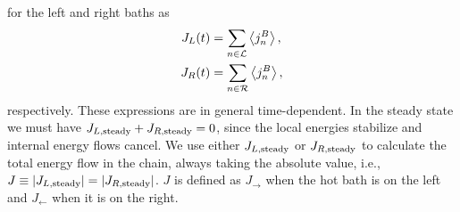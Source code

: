 for the left and right baths as
%
\begin{equation}
    \begin{split}
        J_L (t)&= \sum_{n\in {\cal L}} \expval{j^B_n},\\
        J_R (t)&= \sum_{n\in {\cal R}} \expval{j^B_n},
    \end{split}
    \label{eq:chapter5_BathHeatFlows}
\end{equation}
%
respectively. These expressions are in general time-dependent.
In the steady state we must have $J_{L,{\rm steady}} + J_{R,{\rm steady}} = 0$, since the local energies stabilize and internal energy
flows cancel. We use either $J_{L,{\rm steady}}$ or $J_{R,{\rm steady}}$ to calculate the total energy flow in the chain, always taking the absolute value, i.e., $J \equiv \abs{J_{L,{\rm steady}}}= \abs{J_{R,{\rm steady}}}$. $J$ is defined as $J_\rightarrow$ when the hot bath is on the left
and $J_\leftarrow$ when it is on the right.

